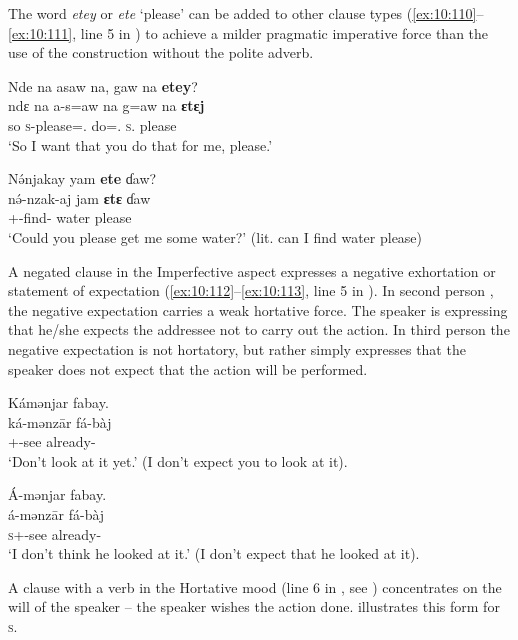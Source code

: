 The word \textit{etey} or \textit{ete} ‘please’ can be added to other clause types (\ref{ex:10:110}--\ref{ex:10:111}, line 5 in ) to achieve a milder pragmatic imperative force than the use of the construction without the polite adverb.

\ea \label{ex:10:110}
Nde na  asaw  na,  gaw  na \textbf{etey}?\\
\gll  ndɛ  na   a-s=aw     na   g=aw     na   \textbf{ɛtɛj}\\
      so  {\PSP}   \textsc{s}-please={\oneS}.{\IO} {\PSP}   do={\oneS}.{\IO}  \textsc{s}.{\DO}  please\\
\glt  ‘So I want that you do that for me, please.’
\z 

\ea \label{ex:10:111}
N\'{ə}njakay  yam \textbf{ete} ɗaw?\\
\gll  n\'{ə}-nzak-aj    jam  \textbf{ɛtɛ}  ɗaw\\
      {\oneS}+{\IFV}-find{}-{\CL}  water  please  {\QUEST}\\
\glt  ‘Could you please get me some water?’ (lit. can I find water please)
\z 

A negated clause in the Imperfective aspect expresses a negative exhortation or statement of expectation (\ref{ex:10:112}--\ref{ex:10:113}, line 5 in ). In second person , the negative expectation carries a weak hortative force. The speaker is expressing that he/she expects the addressee not to carry out the action. In third person  the negative expectation is not hortatory, but rather simply expresses that the speaker does not expect that the action will be performed. 

\ea \label{ex:10:112}
Kámənjar  fabay.\\
\gll  ká-mənz\={a}r     fá-bàj\\
      {\twoS}+{\IFV}-see    already-{\NEG}\\
\glt  ‘Don’t look at it yet.’ (I don’t expect you to look at it).
\z 

\ea \label{ex:10:113}
Á-mənjar     fabay.\\
\gll  á-mənz\={a}r     fá-bàj\\
      \textsc{s}+{\IFV}{}-see    already-{\NEG}\\
\glt  ‘I don’t think he looked at it.’ (I don’t expect that he looked at it).
\z 

A clause with a verb in the Hortative mood (line 6 in , see ) concentrates on the will of the speaker -- the speaker wishes the action done.  illustrates this form for \textsc{s}. 

